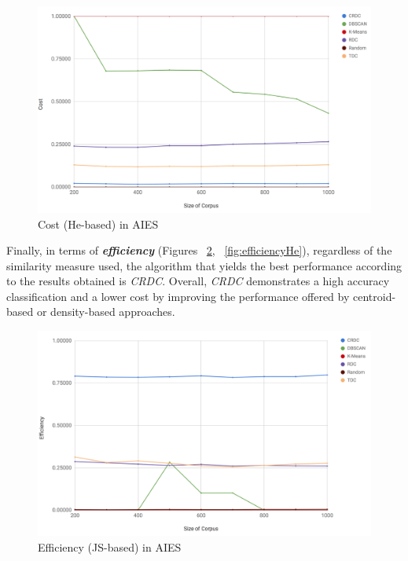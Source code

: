\begin{figure}[!htb]\centering
  \center
  \includegraphics[scale=0.45]{costHe.png}
  \caption{Cost (He-based) in AIES}
  \label{fig:costHe}
\end{figure}

Finally, in terms of \textbf{\textit{efficiency}} (Figures ~\ref{fig:efficiencyJS}, ~\ref{fig:efficiencyHe}), regardless of the similarity measure used, the algorithm that yields the best performance according to the results obtained is \textit{CRDC}. Overall, \textit{CRDC} demonstrates a high accuracy classification and a lower cost by improving the performance offered by centroid-based or density-based approaches.

\begin{figure}[!htb]\centering
  \center
  \includegraphics[scale=0.45]{efficiencyJS.png}
  \caption{Efficiency (JS-based) in AIES}
  \label{fig:efficiencyJS}
\end{figure}

